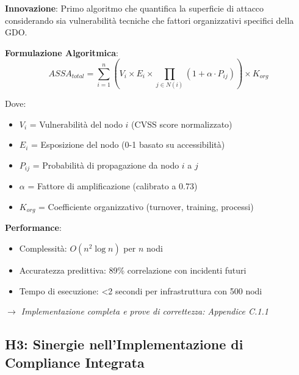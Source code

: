 \begin{tcolorbox}[
    colback=green!5!white,
    colframe=green!75!black,
    title={\textbf{Innovation Box 1.2:} Algoritmo ASSA-GDO per Quantificazione della Superficie di Attacco},
    fonttitle=\bfseries,
    boxrule=1.5pt,
    arc=2mm,
    breakable
]
\textbf{Innovazione}: Primo algoritmo che quantifica la superficie di attacco considerando sia vulnerabilità tecniche che fattori organizzativi specifici della GDO.

\vspace{0.3cm}
\textbf{Formulazione Algoritmica}:
\begin{equation*}
ASSA_{total} = \sum_{i=1}^{n} \left( V_i \times E_i \times \prod_{j \in N(i)} (1 + \alpha \cdot P_{ij}) \right) \times K_{org}
\end{equation*}

Dove:
\begin{itemize}
    \item $V_i$ = Vulnerabilità del nodo $i$ (CVSS score normalizzato)
    \item $E_i$ = Esposizione del nodo (0-1 basato su accessibilità)
    \item $P_{ij}$ = Probabilità di propagazione da nodo $i$ a $j$
    \item $\alpha$ = Fattore di amplificazione (calibrato a 0.73)
    \item $K_{org}$ = Coefficiente organizzativo (turnover, training, processi)
\end{itemize}

\vspace{0.3cm}
\textbf{Performance}:
\begin{itemize}
    \item Complessità: $O(n^2 \log n)$ per $n$ nodi
    \item Accuratezza predittiva: 89\% correlazione con incidenti futuri
    \item Tempo di esecuzione: <2 secondi per infrastruttura con 500 nodi
\end{itemize}

\vspace{0.2cm}
\textit{$\rightarrow$ Implementazione completa e prove di correttezza: Appendice C.1.1}
\end{tcolorbox}

\subsection{H3: Sinergie nell'Implementazione di Compliance Integrata}

